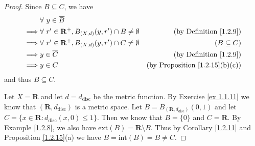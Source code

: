 \begin{proof}
    Since \(B \subseteq C\), we have
    \begin{align*}
                 & \forall\ y \in \overline{B}                                                                                        \\
        \implies & \forall\ r' \in \mathbf{R}^+, B_{(X, d)}(y, r') \cap B \neq \emptyset & \text{(by Definition \ref{1.2.9})}         \\
        \implies & \forall\ r' \in \mathbf{R}^+, B_{(X, d)}(y, r') \cap C \neq \emptyset & (B \subseteq C)                            \\
        \implies & y \in \overline{C}                                                    & \text{(by Definition \ref{1.2.9})}         \\
        \implies & y \in C                                                               & \text{(by Proposition \ref{1.2.15}(b)(c))}
    \end{align*}
    and thus \(\overline{B} \subseteq C\).

    Let \(X = \mathbf{R}\) and let \(d = d_{\text{disc}}\) be the metric function.
    By Exercise \ref{ex 1.1.11} we know that \((\mathbf{R}, d_{\text{disc}})\) is a metric space.
    Let \(B = B_{(\mathbf{R}, d_{\text{disc}})}(0, 1)\) and let \(C = \{x \in \mathbf{R} : d_{\text{disc}}(x, 0) \leq 1\}\).
    Then we know that \(B = \{0\}\) and \(C = \mathbf{R}\).
    By Example \ref{1.2.8}, we also have \(\text{ext}(B) = \mathbf{R} \setminus B\).
    Thus by Corollary \ref{1.2.11} and Proposition \ref{1.2.15}(a) we have \(\overline{B} = \text{int}(B) = B \neq C\).
\end{proof}